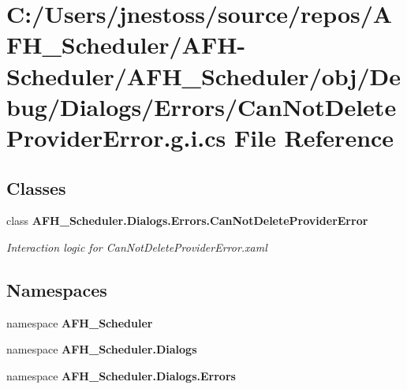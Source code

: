 \section{C\+:/\+Users/jnestoss/source/repos/\+A\+F\+H\+\_\+\+Scheduler/\+A\+F\+H-\/\+Scheduler/\+A\+F\+H\+\_\+\+Scheduler/obj/\+Debug/\+Dialogs/\+Errors/\+Can\+Not\+Delete\+Provider\+Error.g.\+i.\+cs File Reference}
\label{_debug_2_dialogs_2_errors_2_can_not_delete_provider_error_8g_8i_8cs}
\subsection*{Classes}
\begin{DoxyCompactItemize}
\item 
class \textbf{ A\+F\+H\+\_\+\+Scheduler.\+Dialogs.\+Errors.\+Can\+Not\+Delete\+Provider\+Error}
\begin{DoxyCompactList}\small\item\em Interaction logic for Can\+Not\+Delete\+Provider\+Error.\+xaml \end{DoxyCompactList}\end{DoxyCompactItemize}
\subsection*{Namespaces}
\begin{DoxyCompactItemize}
\item 
namespace \textbf{ A\+F\+H\+\_\+\+Scheduler}
\item 
namespace \textbf{ A\+F\+H\+\_\+\+Scheduler.\+Dialogs}
\item 
namespace \textbf{ A\+F\+H\+\_\+\+Scheduler.\+Dialogs.\+Errors}
\end{DoxyCompactItemize}
